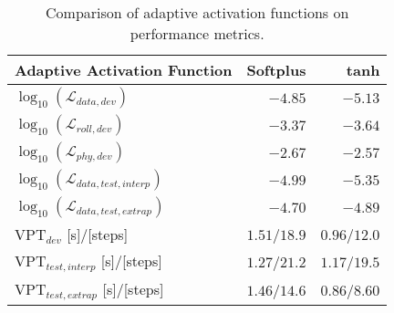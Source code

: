 \begin{table}[!b]
\centering
\caption{Comparison of adaptive activation functions on performance metrics.}
\label{tab:activation_function}
\begin{tabular}{l|r|r|}
\textbf{Adaptive Activation Function}       & \textbf{Softplus} & \textbf{tanh} \\ \hline
$\log_{10}(\mathcal{L}_{data,dev})$         & $-4.85$           & $\bm{-5.13}$  \\ \hline
$\log_{10}(\mathcal{L}_{roll,dev})$         & $-3.37$           & $\bm{-3.64}$  \\ \hline
$\log_{10}(\mathcal{L}_{phy,dev})$          & $\bm{-2.67}$      & $-2.57$       \\ \hline
$\log_{10}(\mathcal{L}_{data,test,interp})$ & $-4.99$           & $\bm{-5.35}$  \\ \hline
$\log_{10}(\mathcal{L}_{data,test,extrap})$ & $-4.70$           & $\bm{-4.89}$  \\ \hline
$\text{VPT}_{dev}$ [s]/[steps]              & $\bm{1.51}$/$18.9$ & $0.96$/$12.0$ \\ \hline
$\text{VPT}_{test,interp}$ [s]/[steps]      & $\bm{1.27}$/$21.2$ & $1.17$/$19.5$ \\ \hline
$\text{VPT}_{test,extrap}$ [s]/[steps]      & $\bm{1.46}$/$14.6$ & $0.86$/$8.60$
\end{tabular}

\end{table}